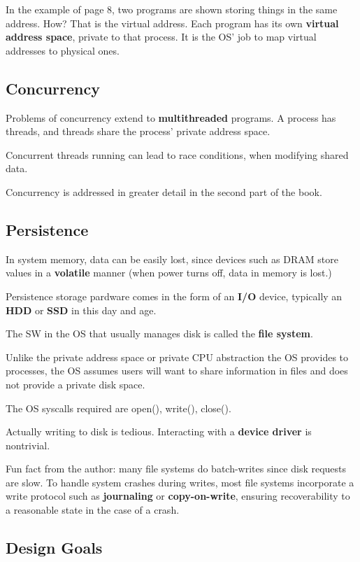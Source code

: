 \documentclass{article}
\begin{document}
In the example of page 8, two programs are shown storing things in the same address.
How? That is the virtual address.
Each program has its own \textbf{virtual address space}, private to that process.
It is the OS' job to map virtual addresses to physical ones.

\subsection{Concurrency}

Problems of concurrency extend to \textbf{multithreaded} programs.
A process has threads, and threads share the process' private address space.

Concurrent threads running can lead to race conditions, when modifying shared data.

Concurrency is addressed in greater detail in the second part of the book.

\subsection{Persistence}

In system memory, data can be easily lost, since devices such as DRAM store values in a \textbf{volatile} manner (when power turns off, data in memory is lost.)

Persistence storage pardware comes in the form of an \textbf{I/O} device, typically an \textbf{HDD} or \textbf{SSD} in this day and age.

The SW in the OS that usually manages disk is called the \textbf{file system}.

Unlike the private address space or private CPU abstraction the OS provides to processes, the OS assumes users will want to share information in files and does not provide a private disk space.

The OS syscalls required are \textsf{open(), write(), close()}.

Actually writing to disk is tedious.
Interacting with a \textbf{device driver} is nontrivial.

Fun fact from the author: many file systems do batch-writes since disk requests are slow.
To handle system crashes during writes, most file systems incorporate a write protocol such as \textbf{journaling} or \textbf{copy-on-write}, ensuring recoverability to a reasonable state in the case of a crash.

\subsection{Design Goals}
\end{document}
